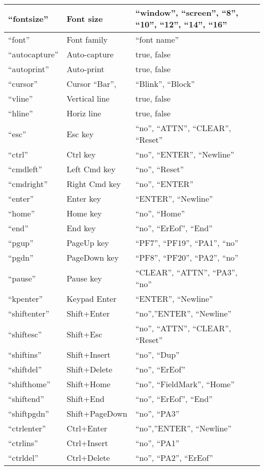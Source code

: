\documentclass[letterpaper,10pt,english]{sphinxmanual}
\begin{document}
\begin{savenotes}
\begin{longtable}{|l|l|l|}
“fontsize”
&
Font size
&
“window”, “screen”, “8”, “10”, “12”, “14”, “16”
\\
\hline
“font”
&
Font family
&
“font name”
\\
\hline
“autocapture”
&
Auto-capture
&
true, false
\\
\hline
“autoprint”
&
Auto-print
&
true, false
\\
\hline
“cursor”
&
Cursor “Bar”,
&
“Blink”, “Block”
\\
\hline
“vline”
&
Vertical line
&
true, false
\\
\hline
“hline”
&
Horiz line
&
true, false
\\
\hline
“esc”
&
Esc key
&
“no”, “ATTN”, “CLEAR”, “Reset”
\\
\hline
“ctrl”
&
Ctrl key
&
“no”, “ENTER”, “Newline”
\\
\hline
“cmdleft”
&
Left Cmd key
&
“no”, “Reset”
\\
\hline
“cmdright”
&
Right Cmd key
&
“no”, “ENTER”
\\
\hline
“enter”
&
Enter key
&
“ENTER”, “Newline”
\\
\hline
“home”
&
Home key
&
“no”, “Home”
\\
\hline
“end”
&
End key
&
“no”, “ErEof”, “End”
\\
\hline
“pgup”
&
PageUp key
&
“PF7”, “PF19”, “PA1”, “no”
\\
\hline
“pgdn”
&
PageDown key
&
“PF8”, “PF20”, “PA2”, “no”
\\
\hline
“pause”
&
Pause key
&
“CLEAR”, “ATTN”, “PA3”, “no”
\\
\hline
“kpenter”
&
Keypad Enter
&
“ENTER”, “Newline”
\\
\hline
“shiftenter”
&
Shift+Enter
&
“no”,”ENTER”, “Newline”
\\
\hline
“shiftesc”
&
Shift+Esc
&
“no”, “ATTN”, “CLEAR”, “Reset”
\\
\hline
“shiftins”
&
Shift+Insert
&
“no”, “Dup”
\\
\hline
“shiftdel”
&
Shift+Delete
&
“no”, “ErEof”
\\
\hline
“shifthome”
&
Shift+Home
&
“no”, “FieldMark”, “Home”
\\
\hline
“shiftend”
&
Shift+End
&
“no”, “ErEof”, “End”
\\
\hline
“shiftpgdn”
&
Shift+PageDown
&
“no”, “PA3”
\\
\hline
“ctrlenter”
&
Ctrl+Enter
&
“no”,”ENTER”, “Newline”
\\
\hline
“ctrlins”
&
Ctrl+Insert
&
“no”, “PA1”
\\
\hline
“ctrldel”
&
Ctrl+Delete
&
“no”, “PA2”, “ErEof”

\end{longtable}
\end{savenotes}
\end{document}

